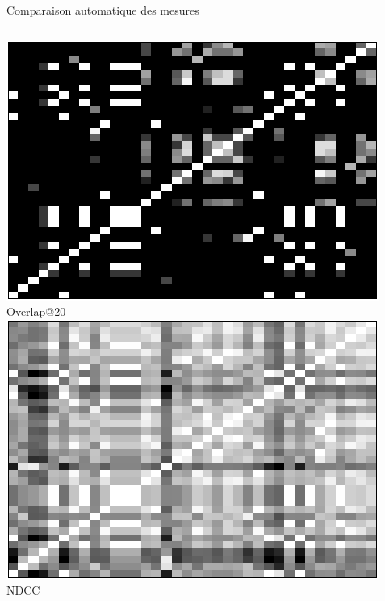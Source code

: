\documentclass[table]{beamer}
\begin{document}
\begin{frame}[t]{Comparaison automatique des mesures}
{\begin{columns}[t]
        \includegraphics[width=\linewidth]{fig/similarityMatrix/similarity-O20.pdf}
        \\\vspace{1em}
        Overlap@20
        \centering
        \includegraphics[width=\linewidth]{fig/similarityMatrix/similarity-NDCG.pdf}
        \\\vspace{1em}
        NDCC
    \end{columns}
  }


\end{frame}
\end{document}
